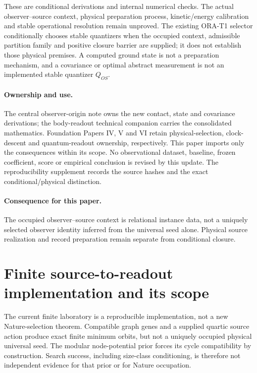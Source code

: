 \documentclass[11pt,a4paper]{article}
\theoremstyle{remark}
\begin{document}
These are conditional derivations and internal numerical checks. The actual
observer--source context, physical preparation process, kinetic/energy
calibration and stable operational resolution remain unproved. The existing
ORA-T1 selector conditionally chooses stable quantizers when the occupied
context, admissible partition family and positive closure barrier are supplied;
it does not establish those physical premises. A computed ground state is not
a preparation mechanism, and a covariance or optimal abstract measurement is
not an implemented stable quantizer $Q_{OS}$.

\paragraph{Ownership and use.}
The central observer-origin note owns the new contact, state and covariance
derivations; the body-readout technical companion carries the consolidated
mathematics. Foundation Papers IV, V and VI retain physical-selection,
clock-descent and quantum-readout ownership, respectively. This paper imports
only the consequences within its scope. No observational dataset, baseline,
frozen coefficient, score or empirical conclusion is revised by this update.
The reproducibility supplement records the source hashes and the exact
conditional/physical distinction.


\paragraph{Consequence for this paper.}
The occupied observer--source context is relational instance data, not a
uniquely selected observer identity inferred from the universal seed alone.
Physical source realization and record preparation remain separate from
conditional closure.

\section{Finite source-to-readout implementation and its scope}
The current finite laboratory is a reproducible implementation, not a new Nature-selection theorem. Compatible graph genes and a supplied quartic source action produce exact finite minimum orbits, but not a uniquely occupied physical universal seed. The modular node-potential prior forces its cycle compatibility by construction. Search success, including size-class conditioning, is therefore not independent evidence for that prior or for Nature occupation.
\end{document}
